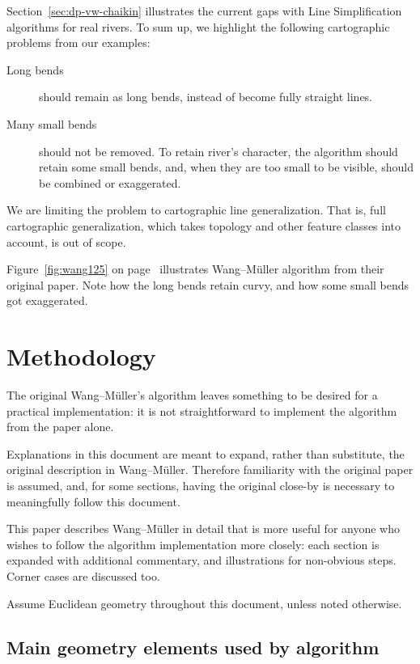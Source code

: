 \documentclass[a4paper]{article}
\newcommand{\onpage}[1]{\ref{#1} on page~\pageref{#1}}
\newcommand{\WM}{Wang--M{\"u}ller}
\begin{document}
Section~\ref{sec:dp-vw-chaikin} illustrates the current gaps with Line
Simplification algorithms for real rivers. To sum up, we highlight the
following cartographic problems from our examples:

\begin{description}

    \item[Long bends] should remain as long bends, instead of become fully
        straight lines.

    \item[Many small bends] should not be removed. To retain river's character,
        the algorithm should retain some small bends, and, when they are too
        small to be visible, should be combined or exaggerated.

\end{description}

We are limiting the problem to cartographic line generalization. That is, full
cartographic generalization, which takes topology and other feature classes
into account, is out of scope.

Figure~\onpage{fig:wang125} illustrates {\WM} algorithm from their original
paper. Note how the long bends retain curvy, and how some small bends got
exaggerated.

\section{Methodology}
\label{sec:methodology}

The original {\WM}'s algorithm \cite{wang1998line} leaves something to be
desired for a practical implementation: it is not straightforward to implement
the algorithm from the paper alone.

Explanations in this document are meant to expand, rather than substitute, the
original description in {\WM}. Therefore familiarity with the original paper is
assumed, and, for some sections, having the original close-by is necessary to
meaningfully follow this document.

This paper describes {\WM} in detail that is more useful for anyone who wishes
to follow the algorithm implementation more closely: each section is expanded
with additional commentary, and illustrations for non-obvious steps. Corner
cases are discussed too.

Assume Euclidean geometry throughout this document, unless noted otherwise.

\subsection{Main geometry elements used by algorithm}
\label{sec:vocab}
\end{document}

